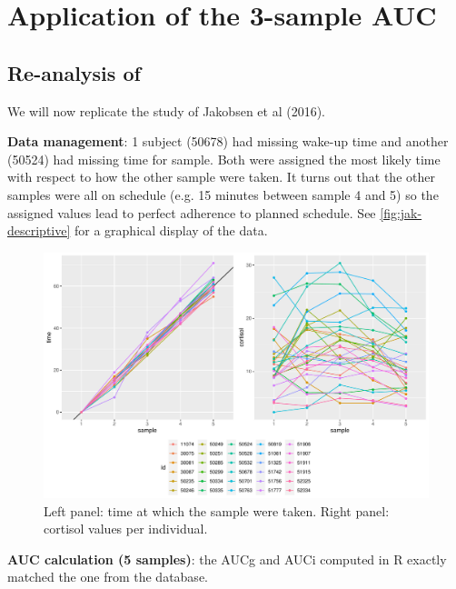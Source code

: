 \documentclass[12pt]{article}
\begin{document}
\FloatBarrier
\clearpage

\section{Application of the 3-sample AUC}
\label{sec:orgba158f0}
\subsection{Re-analysis of \citep{jakobsen2016brain}}
\label{sec:org6e686ae}

We will now replicate the study of Jakobsen et al (2016).

\bigskip

\textbf{Data management}: 1 subject (50678) had missing wake-up time and
another (50524) had missing time for sample. Both were assigned the
most likely time with respect to how the other sample were taken. It
turns out that the other samples were all on schedule (e.g. 15 minutes
between sample 4 and 5) so the assigned values lead to perfect
adherence to planned schedule. See \autoref{fig:jak-descriptive} for a
graphical display of the data.

\begin{figure}[!h]
\centering
\includegraphics[width=1\textwidth]{./figures/gg-jak-descriptive.pdf}
\caption{\label{fig:jak-descriptive}Left panel: time at which the sample were taken. Right panel: cortisol values per individual.}
\end{figure}


\bigskip

\textbf{AUC calculation (5 samples)}: the AUCg and AUCi computed in R exactly
 matched the one from the database.

\bigskip
\end{document}
